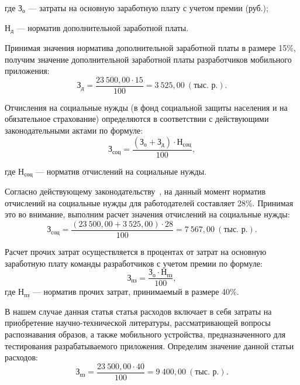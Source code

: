 \noindent где
\( \text{З}_{\text{о}} \)
--- затраты на основную заработную плату с учетом премии (руб.); \par
\noindent \hspace{6.5mm} \( \text{Н}_{\text{д}} \)
--- норматив дополнительной заработной платы.

Принимая значения норматива дополнительной заработной платы в размере 15\%,
получим значение дополнительной заработной платы разработчиков
мобильного приложения:
\begin{equation*}
  \text{З}_{\text{д}} =
  \dfrac{23 \: 500{,}00 \cdot 15}{100} = 3 \: 525{,}00 \: (\text{тыс.~р.}).
\end{equation*}

Отчисления на социальные нужды (в фонд социальной защиты
населения и на обязательное страхование) определяются в соответствии с
действующими законодательными актами по формуле:
\begin{equation*}
  \text{З}_{\text{соц}} =
  \dfrac{(\text{З}_{\text{о}} + \text{З}_{\text{д}}) \cdot \text{Н}_{\text{соц}}}{100},
\end{equation*}

\noindent где
\( \text{Н}_{\text{соц}} \)
--- норматив отчислений на социальные нужды.

Согласно действующему законодательству~\cite{law_social_royalties},
на данный момент норматив отчислений на социальные нужды для работодателей
составляет 28\%. Принимая это во внимание, выполним расчет значения
отчислений на социальные нужды:
\begin{equation*}
  \text{З}_{\text{соц}} =
  \dfrac{(23 \: 500{,}00 + 3 \: 525{,}00) \cdot 28}{100} = 7 \: 567{,}00 \: (\text{тыс.~р.}).
\end{equation*}

Расчет прочих затрат осуществляется в процентах от затрат на основную
заработную плату команды разработчиков с учетом премии по формуле:
\begin{equation*}
  \text{З}_{\text{пз}} =
  \dfrac{\text{З}_{\text{о}} \cdot \text{Н}_{\text{пз}}}{100},
\end{equation*}
\noindent где
\( \text{Н}_{\text{пз}} \)
--- норматив прочих затрат, принимаемый в размере 40\%.

В нашем случае данная статья статья расходов включает в себя затраты на приобретение
научно-технической литературы, рассматривающей вопросы распознавания образов,
а также мобильного устройства, предназначенного
для тестирования разрабатываемого приложения.
Определим значение данной статьи расходов:
\begin{equation*}
  \text{З}_{\text{пз}} =
  \dfrac{23 \: 500{,}00 \cdot 40}{100} = 9 \: 400{,}00 \: (\text{тыс.~р.}).
\end{equation*}

